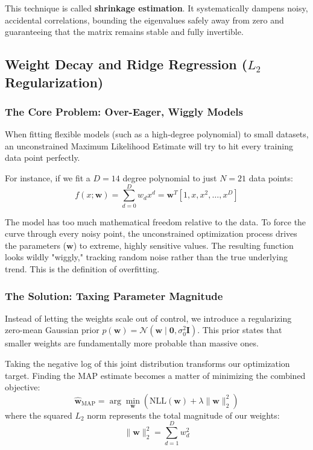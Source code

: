\documentclass{article}
\begin{document}
This technique is called \textbf{shrinkage estimation}. It systematically dampens noisy, accidental correlations, bounding the eigenvalues safely away from zero and guaranteeing that the matrix remains stable and fully invertible.



\subsection{Weight Decay and Ridge Regression ($L_2$ Regularization)}

\subsubsection{The Core Problem: Over-Eager, Wiggly Models}
When fitting flexible models (such as a high-degree polynomial) to small datasets, an unconstrained Maximum Likelihood Estimate will try to hit every training data point perfectly. 

For instance, if we fit a $D = 14$ degree polynomial to just $N = 21$ data points:
\begin{equation}
f(x; \mathbf{w}) = \sum_{d=0}^D w_d x^d = \mathbf{w}^T [1, x, x^2, \dots, x^D]
\end{equation}

The model has too much mathematical freedom relative to the data. To force the curve through every noisy point, the unconstrained optimization process drives the parameters ($\mathbf{w}$) to extreme, highly sensitive values. The resulting function looks wildly "wiggly," tracking random noise rather than the true underlying trend. This is the definition of overfitting.

\subsubsection{The Solution: Taxing Parameter Magnitude}
Instead of letting the weights scale out of control, we introduce a regularizing zero-mean Gaussian prior $p(\mathbf{w}) = \mathcal{N}(\mathbf{w} \mid \mathbf{0}, \sigma_0^2 \mathbf{I})$. This prior states that smaller weights are fundamentally more probable than massive ones. 

Taking the negative log of this joint distribution transforms our optimization target. Finding the $\text{MAP}$ estimate becomes a matter of minimizing the combined objective:
\begin{equation}
\hat{\mathbf{w}}_{\text{MAP}} = \arg\min_{\mathbf{w}} \left( \text{NLL}(\mathbf{w}) + \lambda \|\mathbf{w}\|_2^2 \right)
\end{equation}
where the squared $L_2$ norm represents the total magnitude of our weights:
\begin{equation}
\|\mathbf{w}\|_2^2 = \sum_{d=1}^D w_d^2
\end{equation}
\end{document}
